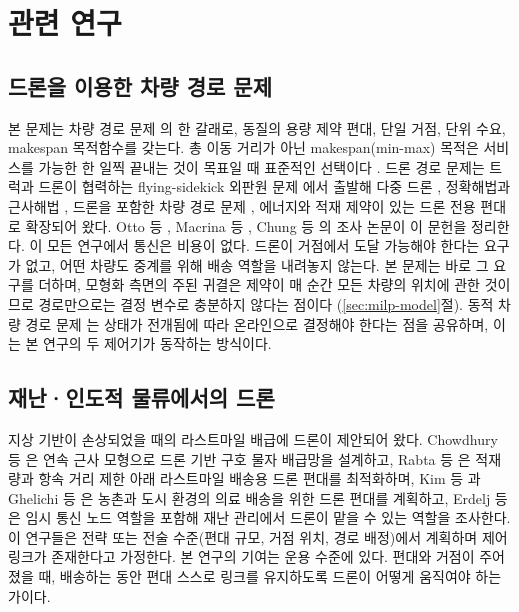 \documentclass[final,5p,times,twocolumn]{elsarticle}
\begin{document}
\section{관련 연구}
\label{sec:related}

\subsection{드론을 이용한 차량 경로 문제}
\label{sec:rel-vrp}
본 문제는 차량 경로 문제 \cite{dantzig1959,toth2014}의 한 갈래로, 동질의 용량 제약 편대, 단일
거점, 단위 수요, makespan 목적함수를 갖는다. 총 이동 거리가 아닌 makespan(min-max) 목적은
서비스를 가능한 한 일찍 끝내는 것이 목표일 때 표준적인 선택이다 \cite{park2023,kitjacharoenchai2019}.
드론 경로 문제는 트럭과 드론이 협력하는 flying-sidekick 외판원 문제 \cite{murray2015}에서 출발해
다중 드론 \cite{murray2020}, 정확해법과 근사해법 \cite{agatz2018,ha2018,roberti2021,dell2021},
드론을 포함한 차량 경로 문제 \cite{poikonen2017,sacramento2019,schermer2019}, 에너지와 적재 제약이
있는 드론 전용 편대 \cite{dorling2017}로 확장되어 왔다. Otto 등 \cite{otto2018}, Macrina 등
\cite{macrina2020}, Chung 등 \cite{chung2020}의 조사 논문이 이 문헌을 정리한다. 이 모든 연구에서
통신은 비용이 없다. 드론이 거점에서 도달 가능해야 한다는 요구가 없고, 어떤 차량도 중계를 위해
배송 역할을 내려놓지 않는다. 본 문제는 바로 그 요구를 더하며, 모형화 측면의 주된 귀결은 제약이 매
순간 모든 차량의 위치에 관한 것이므로 경로만으로는 결정 변수로 충분하지 않다는 점이다
(\ref{sec:milp-model}절). 동적 차량 경로 문제 \cite{pillac2013}는 상태가 전개됨에 따라
온라인으로 결정해야 한다는 점을 공유하며, 이는 본 연구의 두 제어기가 동작하는 방식이다.

\subsection{재난·인도적 물류에서의 드론}
\label{sec:rel-disaster}
지상 기반이 손상되었을 때의 라스트마일 배급에 드론이 제안되어 왔다. Chowdhury 등
\cite{chowdhury2017}은 연속 근사 모형으로 드론 기반 구호 물자 배급망을 설계하고, Rabta 등
\cite{rabta2018}은 적재량과 항속 거리 제한 아래 라스트마일 배송용 드론 편대를 최적화하며, Kim 등
\cite{kim2017}과 Ghelichi 등 \cite{ghelichi2021}은 농촌과 도시 환경의 의료 배송을 위한 드론
편대를 계획하고, Erdelj 등 \cite{erdelj2017}은 임시 통신 노드 역할을 포함해 재난 관리에서 드론이
맡을 수 있는 역할을 조사한다. 이 연구들은 전략 또는 전술 수준(편대 규모, 거점 위치, 경로 배정)에서
계획하며 제어 링크가 존재한다고 가정한다. 본 연구의 기여는 운용 수준에 있다. 편대와 거점이
주어졌을 때, 배송하는 동안 편대 스스로 링크를 유지하도록 드론이 어떻게 움직여야 하는가이다.
\end{document}
